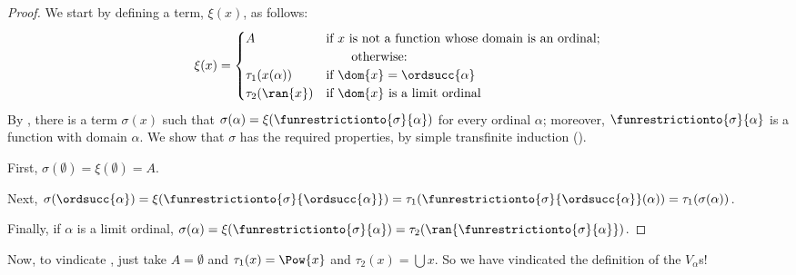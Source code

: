 \documentclass[../../../include/open-logic-section]{subfiles}
\begin{document}
\begin{proof}
We start by defining a term, $\xi(x)$, as follows: 
\[
	\xi(x) = 
	\begin{cases}
			A &\text{if $x$ is not a function whose domain is an ordinal;}\\
			&\hspace{2em}\text{otherwise:}\\
			\tau_1(x(\alpha)) & \text{if $\dom{x} = \ordsucc{\alpha}$}\\
			\tau_2(\ran{x}) & \text{if $\dom{x}$ is a limit ordinal}
	\end{cases}
\]
By , there is a term $\sigma(x)$ such that
$\sigma(\alpha) = \xi(\funrestrictionto{\sigma}{\alpha})$ for every
ordinal $\alpha$; moreover, $\funrestrictionto{\sigma}{\alpha}$ is a
function with domain $\alpha$. We show that $\sigma$ has the required
properties, by simple transfinite induction
(). 

First, $\sigma(\emptyset) = \xi(\emptyset) = A$. 

Next, $\sigma(\ordsucc{\alpha}) = \xi(\funrestrictionto{\sigma}{\ordsucc{\alpha}}) = \tau_1(\funrestrictionto{\sigma}{\ordsucc{\alpha}}(\alpha)) = \tau_1(\sigma(\alpha))$.

Finally, if $\alpha$ is a limit ordinal, $\sigma(\alpha) = \xi(\funrestrictionto{\sigma}{\alpha}) = \tau_2(\ran{\funrestrictionto{\sigma}{\alpha}})$. %
\end{proof}

Now, to vindicate , just take $A
= \emptyset$ and $\tau_1(x) = \Pow{x}$ and $\tau_2(x) = \bigcup x$. So
we have vindicated the definition of the $V_\alpha$s!{}
\end{document}
